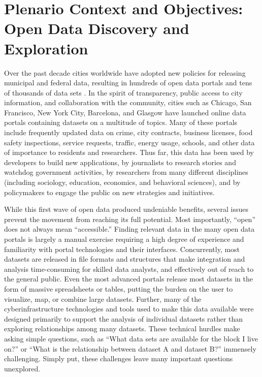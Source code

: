 \documentclass[11pt]{article}
\begin{document}
\section{Plenario Context and Objectives: Open Data Discovery and Exploration}
\label{sec:context-objective}
Over the past decade cities worldwide have adopted new policies for releasing municipal and federal data, resulting in hundreds of open data portals and tens
 of thousands of data sets \cite{maksimovic_2011}. In the spirit of transparency, public access to city information, and collaboration with the community, cities such as Chicago, San Francisco, New York City, Barcelona, and Glasgow have launched online data portals containing datasets on a multitude of topics. Many of these portals include frequently updated data on crime, city contracts, business licenses, food safety inspections, service requests, traffic, energy usage, schools, and other data of importance to residents and researchers. Thus far, this data has been used by developers to build new applications, by journalists to research stories and watchdog government activities, by researchers from many different disciplines (including sociology, education, economics, and behavioral sciences), and by policymakers to engage the public on new strategies and initiatives. 
 
While this first wave of open data produced undeniable benefits, several issues prevent the movement from reaching its full potential. Most importantly, ``open'' does not always mean ``accessible.'' Finding relevant data in the many open data portals is largely a manual exercise requiring a high degree of experience and familiarity with portal technologies and their interfaces. Concurrently, most datasets are released in file formats and structures that make integration and analysis time-consuming for skilled data analysts, and effectively out of reach to the general public. Even the most advanced portals release most datasets in the form of massive spreadsheets or tables, putting the burden on the user to visualize, map, or combine large datasets. Further, many of the cyberinfrastructure technologies and tools used to make this data available were designed primarily to support the analysis of individual datasets rather than exploring relationships among many datasets. These technical hurdles make asking simple questions, such as ``What data sets are available for the block I live on?'' or ``What is the relationship between dataset A and dataset B?'' immensely challenging. Simply put, these challenges leave many important questions unexplored.
\end{document}
